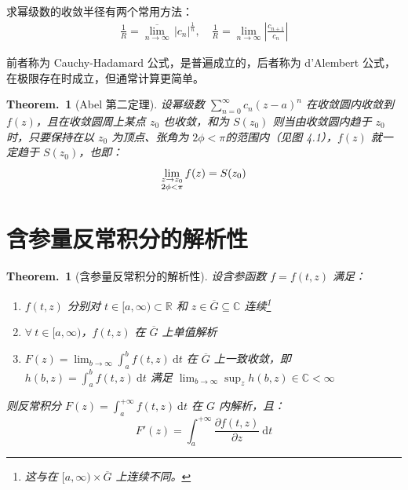 \documentclass[UTF8]{report}
\def\R{\mathbb{R}}
\def\C{\mathbb{C}}
\theoremstyle{MyLineTheoremStyle} %
\theoremstyle{MyBlockTheoremStyle} %
\newtheorem{BlockTheorem}[LineTheorem]{Theorem.\,} %
\theoremstyle{MySubsubsectionStyle} %
\begin{document}
求幂级数的收敛半径有两个常用方法：
\begin{gather}
\frac{1}{R} = \overline{\lim_{n \to \infty}} \, | c_n |^{\frac{1}{n}} ,\quad 
\frac{1}{R} = \lim_{n \to \infty} \left| \frac{c_{n+1}}{c_{n}} \right|
\end{gather}

前者称为 Cauchy-Hadamard 公式，是普遍成立的，后者称为 d'Alembert 公式，在极限存在时成立，但通常计算更简单。

\begin{BlockTheorem}[Abel 第二定理]\label{Abel 第二定理}
设幂级数 $\sum_{n = 0}^{\infty} c_n (z - a)^n$ 在收敛圆内收敛到 $f(z)$，且在收敛圆周上某点 $z_0$ 也收敛，和为 $S(z_0)$ 则当由收敛圆内趋于 $z_0$ 时，只要保持在以 $z_0$ 为顶点、张角为 $2 \phi < \pi$的范围内（见图 4.1），$f(z)$ 就一定趋于 $S(z_0)$，也即：
\begin{equation}
    \lim_{\begin{subarray}{c}
        z \to z_0 \\ 
        2 \phi < \pi
    \end{subarray}}     f(z) = S(z_0)
\end{equation}
\end{BlockTheorem}

\section{含参量反常积分的解析性}

\begin{BlockTheorem}[含参量反常积分的解析性]\label{含参量反常积分的解析性}
\hspace*{-2.8em} 设含参函数 $f = f(t,z)$ 满足：
\begin{enumerate}
\item $f(t,z)$ 分别对 $t\in [a, \infty) \subset \R $ 和 $z\in \overline{G} \subseteq \C$ 连续\footnote{这与在 $[a, \infty)\times \overline{G}$ 上连续不同。}
\item $\forall\ t \in [a, \infty)$，$f(t,z)$ 在 $\overline{G}$ 上单值解析
\item $\displaystyle F(z) = \lim_{b \to \infty} \int_{a}^{b} f(t,z) \ \mathrm{d}t$ 在 $\overline{G}$ 上一致收敛，即 $\displaystyle h(b,z) = \int_{a}^{b} f(t,z) \ \mathrm{d}t$ 满足 $\displaystyle \lim_{b \to \infty} \sup_{z} h(b,z) \in \C < \infty$
\end{enumerate}
则反常积分 $\displaystyle F(z) = \int_{a}^{+\infty} f(t,z)\ \mathrm{d}t$ 在 $G$ 内解析，且：
\begin{equation}
F'(z) = \int_{a}^{+\infty} \frac{\partial f(t,z)}{\partial z}\ \mathrm{d}t
\end{equation}
\end{BlockTheorem}
\end{document}
